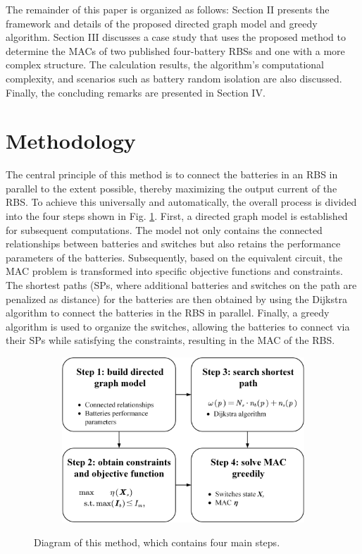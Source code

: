 \documentclass{article}
\begin{document}
The remainder of this paper is organized as follows: 
Section II presents the framework and details of the proposed directed graph model and  greedy algorithm. 
Section III discusses a case study that uses the proposed method to determine the MACs of two published four-battery RBSs and one with a more complex structure. 
The calculation results, the algorithm's computational complexity, and scenarios such as battery random isolation are also discussed. 
Finally, the concluding remarks are presented in Section IV.

\section{Methodology}

The central principle of this method is to connect the batteries in an RBS in parallel to the extent possible, thereby maximizing the output current of the RBS.
To achieve this universally and automatically, the overall process is divided into the four steps shown in Fig. \ref{fig:main}.
First, a directed graph model is established for subsequent computations. The model not only contains the connected relationships between batteries and switches but also retains the performance parameters of the batteries.
Subsequently, based on the equivalent circuit, the MAC problem is transformed into specific objective functions and constraints.
The shortest paths (SPs, where additional batteries and switches on the path are penalized as distance) for the batteries are then obtained  by using the Dijkstra algorithm to connect the batteries in the RBS in parallel.
Finally, a greedy algorithm is used to organize the switches, allowing the batteries to connect via their SPs while satisfying the constraints, resulting in the MAC of the RBS.

\begin{figure}[htbp]
    \centering
    \begin{subfigure}[b]{0.8\textwidth}
        \includegraphics[width=\textwidth]{main.png}
    \end{subfigure}
    \caption{ 
        Diagram of this method, which contains four main steps.
    }
    \label{fig:main}
\end{figure}
\end{document}
